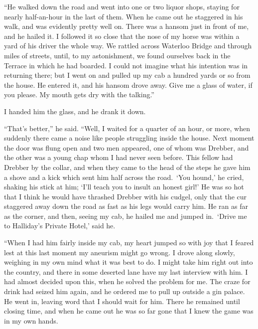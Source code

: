 \documentclass[12pt,english,oneside]{book}
\begin{document}
{}``He walked down the road and went into one or two liquor shops,
staying for nearly half-an-hour in the last of them. When he came
out he staggered in his walk, and was evidently pretty well on. There
was a hansom just in front of me, and he hailed it. I followed it
so close that the nose of my horse was within a yard of his driver
the whole way. We rattled across Waterloo Bridge and through miles
of streets, until, to my astonishment, we found ourselves back in
the Terrace in which he had boarded. I could not imagine what his
intention was in returning there; but I went on and pulled up my cab
a hundred yards or so from the house. He entered it, and his hansom
drove away. Give me a glass of water, if you please. My mouth gets
dry with the talking.''

I handed him the glass, and he drank it down.

{}``That's better,'' he said. {}``Well, I waited for a quarter
of an hour, or more, when suddenly there came a noise like people
struggling inside the house. Next moment the door was flung open and
two men appeared, one of whom was Drebber, and the other was a young
chap whom I had never seen before. This fellow had Drebber by the
collar, and when they came to the head of the steps he gave him a
shove and a kick which sent him half across the road.\  `You hound,'
he cried, shaking his stick at him; `I'll teach you to insult an honest
girl!' He was so hot that I think he would have thrashed Drebber with
his cudgel, only that the cur staggered away down the road as fast
as his legs would carry him. He ran as far as the corner, and then,
seeing my cab, he hailed me and jumped in.\  `Drive me to Halliday's
Private Hotel,' said he.

{}``When I had him fairly inside my cab, my heart jumped so with
joy that I feared lest at this last moment my aneurism might go wrong.
I drove along slowly, weighing in my own mind what it was best to
do. I might take him right out into the country, and there in some
deserted lane have my last interview with him. I had almost decided
upon this, when he solved the problem for me. The craze for drink
had seized him again, and he ordered me to pull up outside a gin palace.
He went in, leaving word that I should wait for him. There he remained
until closing time, and when he came out he was so far gone that I
knew the game was in my own hands.
\end{document}
